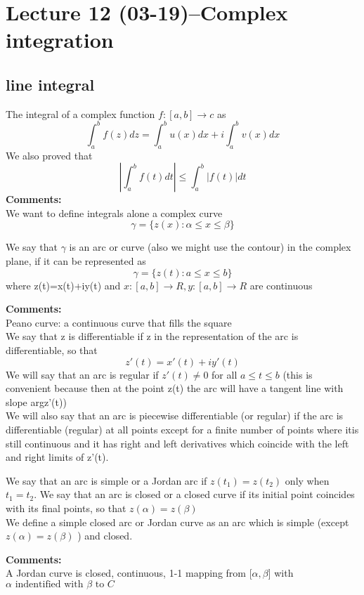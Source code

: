 \section{Lecture 12 (03-19)--{Complex integration}}
\subsection{line integral}
The integral of a complex function $ f:[a,b]\rightarrow c $ as $$
    \int_{a}^{b}f(z)dz=\int_{a}^{b}u(x)dx+i\int_{a}^{b}v(x)dx
$$
We also proved that $$
    |\int_{a}^{b}f(t)dt|\leq\int_{a}^{b}|f(t)|dt
$$ 
\textbf{Comments:}
\\We want to define integrals alone a complex curve $$
    \gamma=\{z(x):\alpha\leq x\leq\beta\}
$$ 
\begin{definition}{}
We say that $ \gamma $ is an arc or curve (also we might use the contour) in the complex plane, if it can be represented as $$
    \gamma=\{z(t):a\leq x\leq b\}
$$ where z(t)=x(t)+iy(t) and $x:[a,b]\rightarrow R,y:[a,b]\rightarrow R$ are continuous
\end{definition}
\textbf{Comments:}
\\Peano curve: a continuous curve that fills the square
\\We say that z is differentiable if z in the representation of the arc is differentiable, so that $$
    z'(t)=x'(t)+iy'(t)
$$ We will say that an arc is regular if $ z'(t)\neq 0 $ for all $a\leq t\leq b  $ (this is convenient because then at the point z(t) the arc will have a tangent line with slope argz'(t))
\\We will also say that an arc is piecewise differentiable (or regular) if the arc is differentiable (regular) at all points except for a finite number of points where itis still continuous and it has right and left derivatives which coincide with the left and right limits of z'(t).
\begin{definition}{}
We say that an arc is simple or a Jordan arc if $ z(t_1)=z(t_2) $ only when $ t_1=t_2 $. We say that an arc is closed or a closed curve if its initial point coincides with its final points, so that $ z(\alpha)=z(\beta) $
\\We define a simple closed arc or Jordan curve as an arc which is simple (except $ z(\alpha)=z(\beta) $ ) and closed.   
\end{definition} 
\textbf{Comments:}
\\A Jordan curve is closed, continuous, 1-1 mapping from [$ \alpha ,\beta$] with $ \alpha\text{ indentified with } \beta  \text{ to } C$
